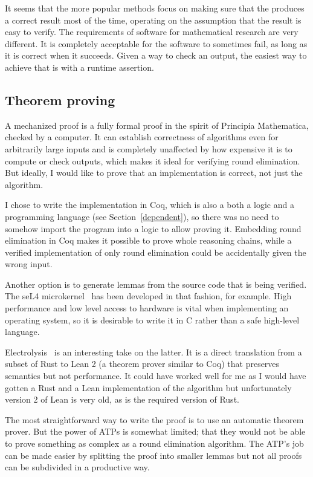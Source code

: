 \documentclass[english, 12pt, a4paper, sci, a-1b, online]{aaltothesis}
\begin{document}
It seems that the more popular methods focus on making sure that the produces a correct result most of the time, operating on the assumption that the result is easy to verify. The requirements of software for mathematical research are very different. It is completely acceptable for the software to sometimes fail, as long as it is correct when it succeeds. Given a way to check an output, the easiest way to achieve that is with a runtime assertion.

\subsection{Theorem proving}

A mechanized proof is a fully formal proof in the spirit of Principia Mathematica, checked by a computer. It can establish correctness of algorithms even for arbitrarily large inputs and is completely unaffected by how expensive it is to compute or check outputs, which makes it ideal for verifying round elimination. But ideally, I would like to prove that an implementation is correct, not just the algorithm.

I chose to write the implementation in Coq, which is also a both a logic and a programming language (see Section~\ref{dependent}), so there was no need to somehow import the program into a logic to allow proving it. Embedding round elimination in Coq makes it possible to prove whole reasoning chains, while a verified implementation of only round elimination could be accidentally given the wrong input.

Another option is to generate lemmas from the source code that is being verified. The seL4 microkernel~\cite{sel4} has been developed in that fashion, for example. High performance and low level access to hardware is vital when implementing an operating system, so it is desirable to write it in C rather than a safe high-level language.

Electrolysis~\cite{electrolysis} is an interesting take on the latter. It is a direct translation from a subset of Rust to Lean 2 (a theorem prover similar to Coq) that preserves semantics but not performance. It could have worked well for me as I would have gotten a Rust and a Lean implementation of the algorithm but unfortunately version 2 of Lean is very old, as is the required version of Rust.

The most straightforward way to write the proof is to use an automatic theorem prover. But the power of ATPs is somewhat limited; that they would not be able to prove something as complex as a round elimination algorithm. The ATP's job can be made easier by splitting the proof into smaller lemmas but not all proofs can be subdivided in a productive way.
\end{document}
